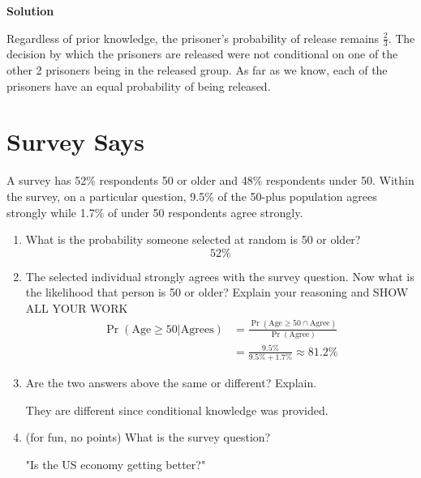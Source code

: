 \documentclass[12pt]{article}
\begin{document}
\textbf{Solution}

Regardless of prior knowledge, the prisoner's probability of release remains $\frac{2}{3}$. The decision by which the prisoners are released were not conditional on one of the other 2 prisoners being in the released group. As far as we know, each of the prisoners have an equal probability of being released. 

\section{Survey Says}
A survey has 52\% respondents 50 or older and 48\% respondents under 50. Within the survey, on a particular
question, 9.5\% of the 50-plus population agrees strongly while 1.7\% of under 50 respondents agree strongly.

\begin{enumerate}
    \item What is the probability someone selected at random is 50 or older?
    \[ 52\%\]
    \item  The selected individual strongly agrees with the survey question. Now what is the likelihood that
person is 50 or older? Explain your reasoning and SHOW ALL YOUR WORK
    \begin{align*}
        \Pr(\text{Age}\geq 50 \bigg| \text{Agrees}) &= \frac{\Pr(\text{Age} \geq 50 \cap \text{Agree}) }{\Pr(\text{Agree}) }
        \\ &= \frac{9.5\%}{9.5\% + 1.7\%} \approx 81.2\%
    \end{align*}
    \item  Are the two answers above the same or different? Explain.

    They are different since conditional knowledge was provided. 
    \item (for fun, no points) What is the survey question?

    "Is the US economy getting better?"
\end{enumerate}
\end{document}
